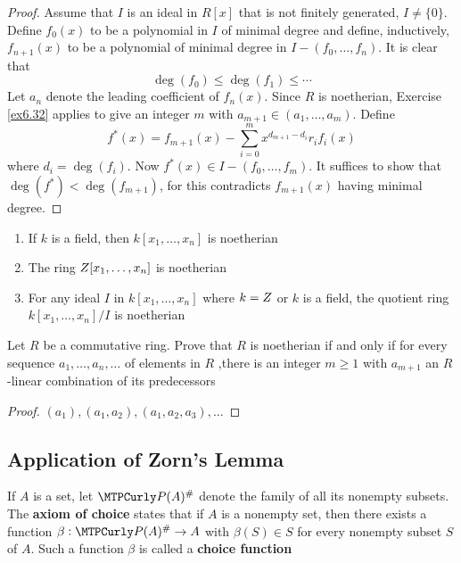 \documentclass[11pt]{article}
\begin{document}
\begin{proof}
Assume that \(I\) is an ideal in \(R[x]\) that is not finitely generated,
\(I\neq\{0\}\). Define \(f_0(x)\) to be a polynomial in \(I\) of minimal degree
and define, inductively, \(f_{n+1}(x)\) to be a polynomial of minimal degree
in \(I-(f_0,\dots,f_n)\). It is clear that 
\begin{equation*}
\deg(f_0)\le\deg(f_1)\le\cdots
\end{equation*}
Let \(a_n\) denote the leading coefficient of \(f_n(x)\). Since \(R\) is
noetherian, Exercise \ref{ex6.32} applies to give an integer \(m\) with
\(a_{m+1}\in(a_1,\dots,a_m)\). Define
\begin{equation*}
f^*(x)=f_{m+1}(x)-\displaystyle\sum_{i=0}^mx^{d_{m+1}-d_i}r_if_i(x)
\end{equation*}
where \(d_i=\deg(f_i)\). Now \(f^*(x)\in I-(f_0,\dots,f_m)\). It suffices to
show that \(\deg(f^*)<\deg(f_{m+1})\), for this contradicts \(f_{m+1}(x)\)
having minimal degree.
\end{proof}

\begin{corollary}[]
\begin{enumerate}
\item If \(k\) is a field, then \(k[x_1,\dots,x_n]\) is noetherian
\item The ring \(\relax{Z}[x_1,\dots,x_n]\) is noetherian
\item For any ideal \(I\) in \(k[x_1,\dots,x_n]\) where \(k=\relax{Z}\) or \(k\) is a
field, the quotient ring \(k[x_1,\dots,x_n]/I\) is noetherian
\end{enumerate}
\end{corollary}

\begin{exercise}
\label{ex6.32}
Let \(R\) be a commutative ring. Prove that \(R\) is noetherian if and only if
for every sequence \(a_1,\dots,a_n,\dots\) of elements in \(R\) ,there is an
integer \(m\ge1\) with \(a_{m+1}\) an \(R\)-linear combination of its predecessors
\end{exercise}

\begin{proof}
\((a_1),(a_1,a_2),(a_1,a_2,a_3),\dots\)
\end{proof}
\subsection{Application of Zorn's Lemma}
\label{sec:orgecef7ec}
\begin{definition}[]
If \(A\) is a set, let \(\calp(A)^\#\) denote the family of all its nonempty
subsets. The \textbf{axiom of choice} states that if \(A\) is a nonempty set, then there
exists a function \(\beta:\calp(A)^\#\to A\) with \(\beta(S)\in S\) for every nonempty
subset \(S\) of \(A\). Such a function \(\beta\) is called a \textbf{choice function}
\end{definition}
\end{document}
